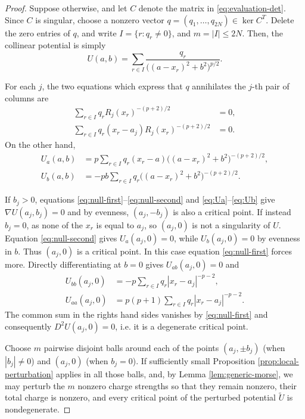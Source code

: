\documentclass[10pt,a4paper]{amsart}
\begin{document}
	\begin{proof}
		Suppose otherwise, and let $C$ denote the matrix in \eqref{eq:evaluation-det}. Since $C$ is singular, choose a nonzero vector $q=(q_1,\ldots,q_{2N})\in\ker C^T$. Delete the zero entries of $q$, and write $I=\{r:q_r\neq0\}$, and $m=|I|\leq2N$. Then, the collinear potential is simply
		\begin{equation}\label{eq:Uaux}
			U(a,b)=\sum_{r\in I}\frac{q_r}{\big((a-x_r)^2+b^2\big)^{p/2}}.
		\end{equation}

		For each $j$, the two equations which express that $q$ annihilates the $j$-th pair of columns are
		\begin{align}
			\sum_{r\in I}q_rR_j(x_r)^{-(p+2)/2}&=0,
			\label{eq:null-first}\\
			\sum_{r\in I}q_r(x_r-a_j)R_j(x_r)^{-(p+2)/2}&=0.
			\label{eq:null-second}
		\end{align}
		On the other hand,
		\begin{align}
			U_a(a,b)
			&=p\sum_{r\in I}q_r(x_r-a)
			\big((a-x_r)^2+b^2\big)^{-(p+2)/2},
			\label{eq:Ua}\\
			U_b(a,b)
			&=-pb\sum_{r\in I}q_r
			\big((a-x_r)^2+b^2\big)^{-(p+2)/2}.
			\label{eq:Ub}
		\end{align}
		
		If $b_j>0$, equations \eqref{eq:null-first}--\eqref{eq:null-second} and \eqref{eq:Ua}--\eqref{eq:Ub} give $\nabla U(a_j,b_j)=0$ and by evenness, $(a_j,-b_j)$ is also a critical point. If instead $b_j=0$, as none of the $x_r$ is equal to $a_j$, so $(a_j,0)$ is not a singularity of $U$. Equation \eqref{eq:null-second} gives $U_a(a_j,0)=0$, while $U_b(a_j,0)=0$ by evenness in $b$. Thus $(a_j,0)$ is a critical point. In this case equation \eqref{eq:null-first} forces more. Directly differentiating at $b=0$ gives $U_{ab}(a_j,0)=0$ and
		\begin{align*}
			U_{bb}(a_j,0)
			&=-p\sum_{r\in I}q_r|x_r-a_j|^{-p-2},\\
			U_{aa}(a_j,0)
			&=p(p+1)\sum_{r\in I}q_r|x_r-a_j|^{-p-2}.
		\end{align*}
		The common sum in the rights hand sides vanishes by \eqref{eq:null-first} and consequently $
		D^2U(a_j,0)=0$, i.e. it is a degenerate critical point.
		
		Choose $m$ pairwise disjoint balls around each of the points $(a_j,\pm b_j)$ (when $|b_j| \neq 0$) and $(a_j,0)$ (when $b_j=0$). If sufficiently small Proposition \ref{prop:local-perturbation} applies in all those balls, and, by Lemma \ref{lem:generic-morse}, we may perturb the $m$ nonzero charge strengths so that they remain nonzero, their total charge is nonzero, and every critical point of the perturbed potential $\widetilde U$ is nondegenerate. 
		

\end{proof}
\end{document}
